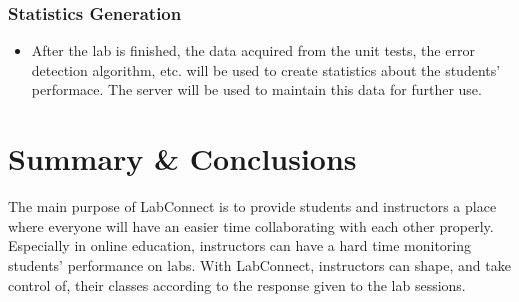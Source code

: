 \documentclass[a4paper, 12pt]{article}
\begin{document}
    \subsubsection{Statistics Generation}

    \begin{itemize}
      \item After the lab is finished, the data acquired from the unit tests, the error detection algorithm, etc. will be used
      to create statistics about the students' performace. The server will be used to maintain this data for further use.
    \end{itemize}

    \section{Summary \& Conclusions}

    The main purpose of LabConnect is to provide students and instructors a place where everyone will have an easier time
    collaborating with each other properly. Especially in online education, instructors can have a hard time monitoring students'
    performance on labs. With LabConnect, instructors can shape, and take control of, their classes according to the response given to the lab sessions.

    \pagebreak

    \printbibliography
\end{document}
